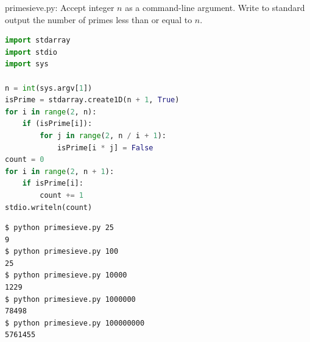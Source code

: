 \documentclass[8pt,a4paper,compress]{beamer}
\begin{document}
\begin{frame}[fragile]
\pause

\begin{framed}
\tiny primesieve.py: Accept integer $n$ as a command-line argument. Write to standard output the number of primes less than or equal to $n$.
\end{framed}

\begin{minipage}{160pt}
\begin{lstlisting}[language=Python]
import stdarray
import stdio
import sys

n = int(sys.argv[1])
isPrime = stdarray.create1D(n + 1, True)
for i in range(2, n):
    if (isPrime[i]):
        for j in range(2, n / i + 1):
            isPrime[i * j] = False
count = 0
for i in range(2, n + 1):
    if isPrime[i]:
        count += 1
stdio.writeln(count)
\end{lstlisting}

\end{minipage}%
\begin{minipage}{140pt}
\hfill {}
\end{minipage}

\pause

\begin{lstlisting}[language={}]
$ python primesieve.py 25
9
$ python primesieve.py 100
25
$ python primesieve.py 10000
1229
$ python primesieve.py 1000000
78498
$ python primesieve.py 100000000
5761455
\end{lstlisting}
\end{frame}
\end{document}
